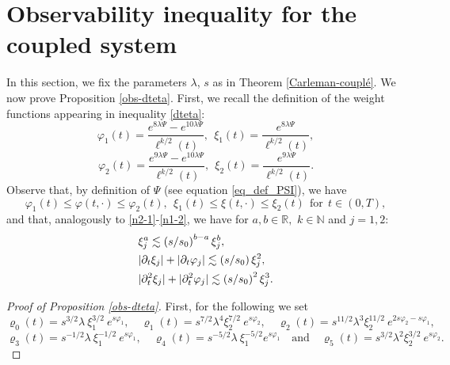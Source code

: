 \documentclass[a4paper, 12pt]{article}
\theoremstyle{plain}
\theoremstyle{definition}
\numberwithin{theorem}{section}
\numberwithin{equation}{section}
\def\R{\mathbb{R}}
\def\N{\mathbb{N}}
\begin{document}
{\section{Observability inequality for the coupled system}\label{section_observability}

In this section, we fix the parameters $\lambda$, $s$ as in Theorem \ref{Carleman-couplé}.
We now prove Proposition \ref{obs-dteta}. First, we recall the definition of the weight functions appearing in inequality \eqref{dteta}:
\begin{equation}\label{poids en t1}
\varphi_1(t)=\frac{e^{8\lambda\Psi}-e^{10\lambda\Psi}}{\ell^{k/2}(t)},~~\xi_1(t)=\frac{e^{8\lambda\Psi}}{\ell^{k/2}(t)},
\end{equation}
\begin{equation}\label{poids en t2}
\varphi_2(t)=\frac{e^{9\lambda\Psi}-e^{10\lambda\Psi}}{\ell^{k/2}(t)},~~\xi_2(t)=\frac{e^{9\lambda\Psi}}{\ell^{k/2}(t)}.
\end{equation}
Observe that, by definition of $\Psi$ (see equation \eqref{eq_def_PSI}), we have 
\begin{equation}\label{OrdreVarphi12}\varphi_1(t)\leq\varphi(t,\cdot)\leq\varphi_2(t),~~\xi_1(t)\leq \xi(t,\cdot)\leq\xi_2(t)~~\text{for}~~t\in(0,T),
\end{equation}
and that, analogously to \eqref{n2-1}-\eqref{n1-2}, we have for $a,b\in\R,$ $k\in\N$ and $j=1,2$:
\begin{align}\label{E1}
 &\xi_j^a\lesssim \left(s/s_0\right)^{b-a}\xi^b_j,\notag\\ 
 &|\partial_t\xi_j|+|\partial_t\varphi_j|\lesssim\left(s/s_0\right) \xi_j^{2}, \\ 
 &|\partial^2_t\xi_j|+|\partial^2_t\varphi_j|\lesssim\left(s/s_0\right)^2 \xi_j^3.\notag
\end{align}

\begin{proof}[Proof of Proposition \ref{obs-dteta}]
First, for the following we set
\begin{equation}\label{DefVarrho01}
\varrho_0(t)=s^{3/2}\lambda~\xi^{3/2}_1~e^{s\varphi_1},\quad \varrho_1(t)=s^{7/2}\lambda^4\xi_2^{7/2}~e^{s\varphi_2},\quad \varrho_2(t)=s^{11/2}\lambda^{3}\xi_2^{11/2}~e^{2s\varphi_2-s\varphi_1},
\end{equation}
$$
\varrho_3(t)=s^{-1/2}\lambda~\xi_1^{-1/2}~e^{s\varphi_1},\quad \varrho_4(t)=s^{-5/2}\lambda~\xi_1^{-5/2}e^{s\varphi_1}\quad\mbox{and}\quad \varrho_5(t)=s^{3/2}\lambda^2\xi_2^{3/2}~e^{s\varphi_2}.
$$


\end{proof}}
\end{document}
